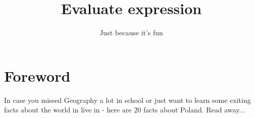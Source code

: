\documentclass{42-en}
\begin{document}
                           \title{Evaluate expression}
                          \subtitle{Just because it's fun}


\maketitle

\tableofcontents


\chapter{Foreword}

    In case you missed Geography a lot in school or just want to learn some exiting facts about the world in live in - here are 20 facts about Poland. Read away...\\
\end{document}
